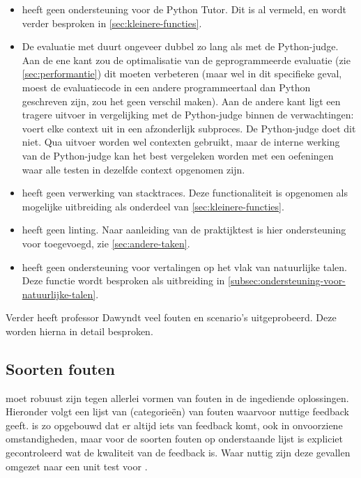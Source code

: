 \begin{itemize}
    \item \tested{} heeft geen ondersteuning voor de Python Tutor.
    Dit is al vermeld, en wordt verder besproken in \cref{sec:kleinere-functies}.
    \item De evaluatie met \tested{} duurt ongeveer dubbel zo lang als met de Python-judge.
    Aan de ene kant zou de optimalisatie van de geprogrammeerde evaluatie (zie \cref{sec:performantie}) dit moeten verbeteren (maar wel in dit specifieke geval, moest de evaluatiecode in een andere programmeertaal dan Python geschreven zijn, zou het geen verschil maken).
    Aan de andere kant ligt een tragere uitvoer in vergelijking met de Python-judge binnen de verwachtingen: \tested{} voert elke context uit in een afzonderlijk subproces.
    De Python-judge doet dit niet.
    Qua uitvoer worden wel contexten gebruikt, maar de interne werking van de Python-judge kan het best vergeleken worden met een oefeningen waar alle testen in dezelfde context opgenomen zijn.
    \item \tested{} heeft geen verwerking van stacktraces.
    Deze functionaliteit is opgenomen als mogelijke uitbreiding als onderdeel van \cref{sec:kleinere-functies}.
    \item \tested{} heeft geen linting.
    Naar aanleiding van de praktijktest is hier ondersteuning voor toegevoegd, zie \cref{sec:andere-taken}.
    \item \tested{} heeft geen ondersteuning voor vertalingen op het vlak van natuurlijke talen.
    Deze functie wordt besproken als uitbreiding in \cref{subsec:ondersteuning-voor-natuurlijke-talen}.
\end{itemize}

Verder heeft professor Dawyndt veel fouten en scenario's uitgeprobeerd.
Deze worden hierna in detail besproken.

\subsection{Soorten fouten}\label{subsec:soorten-fouten}

\tested{} moet robuust zijn tegen allerlei vormen van fouten in de ingediende oplossingen.
Hieronder volgt een lijst van (categorieën) van fouten waarvoor \tested{} nuttige feedback geeft.
\tested{} is zo opgebouwd dat er altijd iets van feedback komt, ook in onvoorziene omstandigheden, maar voor de soorten fouten op onderstaande lijst is expliciet gecontroleerd wat de kwaliteit van de feedback is.
Waar nuttig zijn deze gevallen omgezet naar een unit test voor \tested{}.

